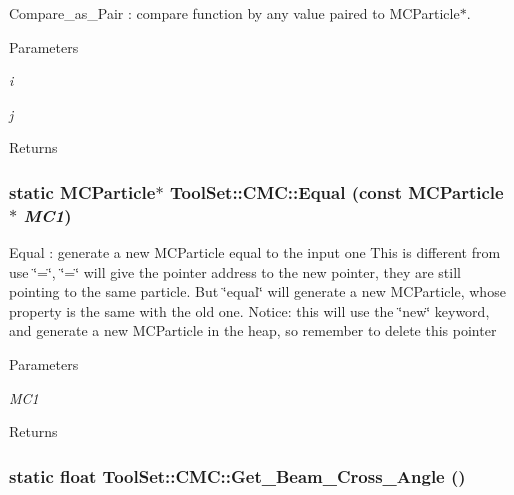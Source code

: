 Compare\_\-as\_\-Pair : compare function by any value paired to MCParticle$\ast$. 
\begin{DoxyParams}{Parameters}
\item[{\em i}]\item[{\em j}]\end{DoxyParams}
\begin{DoxyReturn}{Returns}

\end{DoxyReturn}
\hypertarget{classToolSet_1_1CMC_a29838e430204b6f0d6e5cdf8a669f615}{
\subsubsection[{Equal}]{\setlength{\rightskip}{0pt plus 5cm}static MCParticle$\ast$ ToolSet::CMC::Equal (const MCParticle $\ast$ {\em MC1})}}
\label{classToolSet_1_1CMC_a29838e430204b6f0d6e5cdf8a669f615}


Equal : generate a new MCParticle equal to the input one This is different from use \char`\"{}=\char`\"{}, \char`\"{}=\char`\"{} will give the pointer address to the new pointer, they are still pointing to the same particle. But \char`\"{}equal\char`\"{} will generate a new MCParticle, whose property is the same with the old one. Notice: this will use the \char`\"{}new\char`\"{} keyword, and generate a new MCParticle in the heap, so remember to delete this pointer


\begin{DoxyParams}{Parameters}
\item[{\em MC1}]\end{DoxyParams}
\begin{DoxyReturn}{Returns}

\end{DoxyReturn}
\hypertarget{classToolSet_1_1CMC_aab8dca236c78fffe1b63bac50583090a}{
\subsubsection[{Get\_\-Beam\_\-Cross\_\-Angle}]{\setlength{\rightskip}{0pt plus 5cm}static float ToolSet::CMC::Get\_\-Beam\_\-Cross\_\-Angle ()}}
\label{classToolSet_1_1CMC_aab8dca236c78fffe1b63bac50583090a}


